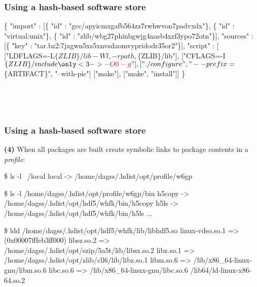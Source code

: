 \documentclass[sans,mathserif]{beamer}
\begin{document}
\begin{frame}[fragile]
  \frametitle{Using a hash-based software store}
{\footnotesize
\begin{semiverbatim}
\{ "import" : [\{ "id" : "gcc/apyicmxgafb564zz7rwhwvon7padvxdx"\},
               \{ "id" : "virtual:unix"\},
               \{ "id" : "zlib/wbg27phinbgwjg4nasb4xzf3ypo72otn"\}],
   "sources" : [\{ "key" : "tar.bz2:7jxgwn5xs5xnvsdaomvypridodr35or2"\}],
   "script" : [
        ["LDFLAGS=-L$\{ZLIB\}/lib -Wl,-rpath,$\{ZLIB\}/lib"],
        ["CFLAGS=-I$\{ZLIB\}/include\only<3->{{\color{red} -O0 -g}}"],
        ["./configure", "--prefix=$\{ARTIFACT\}", "--with-pic"]
        ["make"],
        ["make", "install"]]
\}
\end{semiverbatim}
}

~


~


\end{frame}

\begin{frame}[fragile]
  \frametitle{Using a hash-based software store}
{\bf (4)} When all packages are built create symbolic links to
  package contents in a {\em profile}:
{
\footnotesize

\begin{semiverbatim}
\$ ls -l ~/local
local -> /home/dagss/.hdist/opt/profile/w6gp

\$ ls -l /home/dagss/.hdist/opt/profile/w6gp/bin
h5copy -> /home/dagss/.hdist/opt/hdf5/whfk/bin/h5copy
h5ls -> /home/dagss/.hdist/opt/hdf5/whfk/bin/h5ls
...

\$ ldd /home/dagss/.hdist/opt/hdf5/whfk/lib/libhdf5.so
linux-vdso.so.1 => (0x00007fffeb3ff000)
libsz.so.2 => {\color{red}/home/dagss/.hdist/opt/szip/5a5t/lib/libsz.so.2}
libz.so.1 => {\color{red}/home/dagss/.hdist/opt/zlib/cll6/lib/libz.so.1}
libm.so.6 => /lib/x86\_64-linux-gnu/libm.so.6
libc.so.6 => /lib/x86\_64-linux-gnu/libc.so.6
/lib64/ld-linux-x86-64.so.2
\end{semiverbatim}
}
  
\end{frame}
\end{document}
